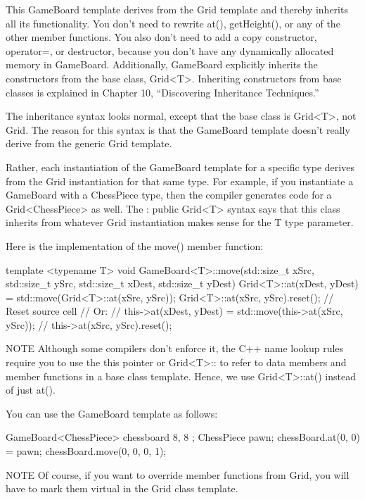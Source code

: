 This GameBoard template derives from the Grid template and thereby inherits all its functionality. You don’t need to rewrite at(), getHeight(), or any of the other member functions. You also don’t need to add a copy constructor, operator=, or destructor, because you don’t have any dynamically allocated memory in GameBoard. Additionally, GameBoard explicitly inherits the constructors from the base class, Grid<T>. Inheriting constructors from base classes is explained in Chapter 10, “Discovering Inheritance Techniques.”

The inheritance syntax looks normal, except that the base class is Grid<T>, not Grid. The reason for this syntax is that the GameBoard template doesn’t really derive from the generic Grid template.

Rather, each instantiation of the GameBoard template for a specific type derives from the Grid instantiation for that same type. For example, if you instantiate a GameBoard with a ChessPiece type, then the compiler generates code for a Grid<ChessPiece> as well. The : public Grid<T> syntax says that this class inherits from whatever Grid instantiation makes sense for the T type parameter.

Here is the implementation of the move() member function:

\begin{cpp}
template <typename T>
void GameBoard<T>::move(std::size_t xSrc, std::size_t ySrc,
    std::size_t xDest, std::size_t yDest)
{
    Grid<T>::at(xDest, yDest) = std::move(Grid<T>::at(xSrc, ySrc));
    Grid<T>::at(xSrc, ySrc).reset(); // Reset source cell
    // Or:
    // this->at(xDest, yDest) = std::move(this->at(xSrc, ySrc));
    // this->at(xSrc, ySrc).reset();
}
\end{cpp}

\begin{myNotic}{NOTE}
Although some compilers don’t enforce it, the C++ name lookup rules require you to use the this pointer or Grid<T>:: to refer to data members and member functions in a base class template. Hence, we use Grid<T>::at() instead of just at().
\end{myNotic}

You can use the GameBoard template as follows:

\begin{cpp}
GameBoard<ChessPiece> chessboard { 8, 8 };
ChessPiece pawn;
chessBoard.at(0, 0) = pawn;
chessBoard.move(0, 0, 0, 1);
\end{cpp}

\begin{myNotic}{NOTE}
Of course, if you want to override member functions from Grid, you will have to mark them virtual in the Grid class template.
\end{myNotic}

